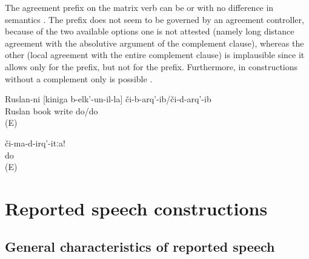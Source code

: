 The agreement prefix on the matrix verb can be  or  with no difference in semantics . The prefix does not seem to be governed by an agreement controller, because of the two available options one is not attested (namely long distance agreement with the absolutive argument of the complement clause), whereas the other (local agreement with the entire complement clause) is implausible since it allows only for the  prefix, but not for the  prefix. Furthermore, in constructions without a complement only  is possible .
%
\begin{exe}
	\ex	\label{ex:‎‎‎Ruslan pretended to write a book}
	\gll	Ruslan-ni	[kiniga	b-elk'-un-il-la]	či-b-arq'-ib/či-d-arq'-ib\\
		Ruslan	book	write	do\slash{}do\\
	\glt	{} (E)

	\ex	\label{ex:‎Do not pretend}
	\gll	či-ma-d-irq'-itːa!\\
		do\\
	\glt	{} (E)
\end{exe}







\section{Reported speech constructions}
\label{sec:Reported speech constructions}



\subsection{General characteristics of reported speech}
\label{ssec:General characteristics of reported speech}

